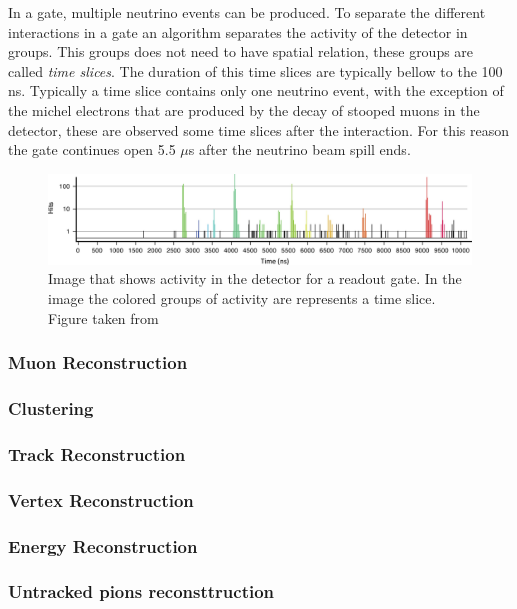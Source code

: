 In a gate, multiple neutrino events can be produced. To separate the different interactions in a gate an algorithm separates the activity of the detector in groups. This groups does not need to have spatial relation, these groups are called \textit{time slices}. The duration of this time slices are typically bellow to the 100 ns. Typically a time slice contains only one neutrino event, with the exception of the michel electrons that are produced by the decay of stooped muons in the detector, these are observed some time slices after the interaction. For this reason the gate continues open 5.5 $\mu$s after the neutrino beam spill ends. 

\begin{figure}
    \centering
    \includegraphics[scale=1]{Figures/Chapter2/OneGate.jpg}
    \caption{Image that shows activity in the detector for a readout gate. In the image the colored groups of activity are represents a time slice. Figure taken from \cite{MINERvA}}
    \label{fig:MnvExp:MnvDetector:CalibrationOneGate}
\end{figure}

\subsubsection{Muon Reconstruction}
\label{Cap:MnvExp:MnvDetector:DataReconstruction:MuonReconstruction}
\subsubsection{Clustering}
\label{Cap:MnvExp:MnvDetector:DataReconstruction:Clustering}
\subsubsection{Track Reconstruction}
\label{Cap:MnvExp:MnvDetector:DataReconstruction:TrackReconstruction}
\subsubsection{Vertex Reconstruction}
\label{Cap:MnvExp:MnvDetector:DataReconstruction:VertexReconstruction}
\subsubsection{Energy Reconstruction}
\label{Cap:MnvExp:MnvDetector:DataReconstruction:ENergyReconstruction}

\subsubsection{Untracked pions reconsttruction}
\label{Cap:MnvExp:MnvDetector:DataReconstruction:Untrackedpions}


 







